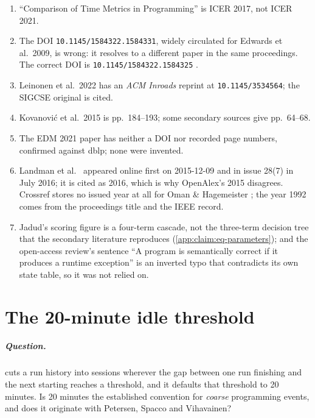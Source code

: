 \begin{enumerate}
\item \enquote{Comparison of Time Metrics in Programming}
  \autocite{leinonen2017comparison} is ICER 2017, not ICER 2021.
\item The DOI \nolinkurl{10.1145/1584322.1584331}, widely circulated for
  Edwards et al.\ 2009, is wrong: it resolves to a different paper in the
  same proceedings.  The correct DOI is \nolinkurl{10.1145/1584322.1584325}
  \autocite{edwards2009comparing}.
\item Leinonen et al.\ 2022 \autocite{leinonen2022timeontask} has an
  \emph{ACM Inroads} reprint at \nolinkurl{10.1145/3534564}; the SIGCSE
  original is cited.
\item Kovanovi\'c et al.\ 2015 \autocite{kovanovic2015penetrating} is
  pp.~184--193; some secondary sources give pp.~64--68.
\item The EDM 2021 paper \autocite{leinonen2021finegrained} has neither a
  DOI nor recorded page numbers, confirmed against dblp; none were invented.
\item Landman et al.\ \autocite{Landman2016} appeared online first on
  2015-12-09 and in issue 28(7) in July 2016; it is cited as 2016, which is
  why OpenAlex's 2015 disagrees.  Crossref stores no issued year at all for
  Oman \& Hagemeister \autocite{OmanHagemeister1992}; the year 1992 comes
  from the proceedings title and the IEEE record.
\item Jadud's scoring figure is a four-term cascade, not the three-term
  decision tree that the secondary literature reproduces
  (\cref{app:claim:eq-parameters}); and the open-access review's sentence
  \enquote{A program is semantically correct if it produces a runtime
  exception} is an inverted typo that contradicts its own state table, so it
  was not relied on.
\end{enumerate}

\chapter{The 20-minute idle threshold}
\label{app:claim:idle-threshold}

\paragraph{Question.}
 cuts a run history into sessions wherever the gap
between one run finishing and the next starting reaches a threshold, and it
defaults that threshold to 20 minutes.  Is 20 minutes the established
convention for \emph{coarse} programming events, and does it originate with
Petersen, Spacco and Vihavainen?

